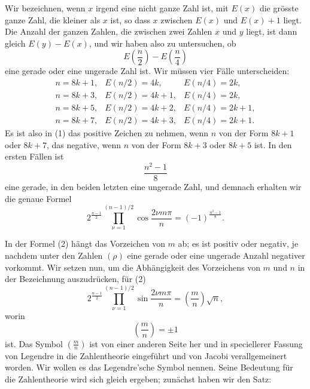\documentclass[11pt]{article}
\begin{document}
Wir bezeichnen, wenn $x$ irgend eine nicht ganze Zahl ist, mit $E(x)$ die grösste ganze Zahl, die kleiner als $x$ ist, so dass $x$ zwischen $E(x)$ und $E(x)+1$ liegt. Die Anzahl der ganzen Zahlen, die zwischen zwei Zahlen $x$ und $y$ liegt, ist dann gleich $E(y)-E(x)$, und wir haben also zu untersuchen, ob
\[
        E\left(\frac n2\right)-E\left(\frac n4\right)
\]
eine gerade oder eine ungerade Zahl ist. Wir müssen vier Fälle unterscheiden:
\[
\begin{array}{lll}
 n=8k+1, & E(n/2)=4k,   & E(n/4)=2k,\\
 n=8k+3, & E(n/2)=4k+1, & E(n/4)=2k,\\
 n=8k+5, & E(n/2)=4k+2, & E(n/4)=2k+1,\\
 n=8k+7, & E(n/2)=4k+3, & E(n/4)=2k+1.
\end{array}
\]
Es ist also in (1) das positive Zeichen zu nehmen, wenn $n$ von der Form $8k+1$ oder $8k+7$, das negative, wenn $n$ von der Form $8k+3$ oder $8k+5$ ist. In den ersten Fällen ist
\[
        \frac{n^2-1}{8}
\]
eine gerade, in den beiden letzten eine ungerade Zahl, und demnach erhalten wir die genaue Formel
\[
\tag{3}
2^{\frac{n-1}{2}}\prod_{\nu=1}^{(n-1)/2}
       \cos\frac{2\nu m\pi}{n}
   =(-1)^{\frac{n^2-1}{8}}.
\]

In der Formel (2) hängt das Vorzeichen von $m$ ab; es ist positiv oder negativ, je nachdem unter den Zahlen $(\rho)$ eine gerade oder eine ungerade Anzahl negativer vorkommt. Wir setzen nun, um die Abhängigkeit des Vorzeichens von $m$ und $n$ in der Bezeichnung auszudrücken, für (2)
\[
\tag{4}
2^{\frac{n-1}{2}}\prod_{\nu=1}^{(n-1)/2}
       \sin\frac{2\nu m\pi}{n}
   =\left(\frac mn\right)\sqrt n,
\]
worin
\[
        \left(\frac mn\right)=\pm1
\]
ist. Das Symbol $\left(\frac mn\right)$ ist von einer anderen Seite her und in speciellerer Fassung von Legendre in die Zahlentheorie eingeführt und von Jacobi verallgemeinert worden. Wir wollen es das Legendre'sche Symbol nennen. Seine Bedeutung für die Zahlentheorie wird sich gleich ergeben; zunächst haben wir den Satz:
\end{document}
